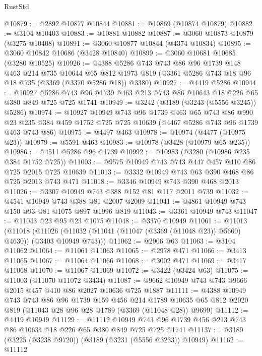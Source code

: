 \begin{lexlean}{RustStd}
\begin{coremodule}
@10879 := @2892 @10877 @10844
@10881 := @10869 (@10874 @10879)
@10882 := @3104 @10403
@10883 := @10881 @10882
@10887 := @3060 @10873 @10879 (@3275 @10408)
@10891 := @3060 @10877 @10844 (@4374 @10834)
@10895 := @3060 @10842 @10686 (@3428 @10840)
@10899 := @3060 @10681 @10685 (@3280 @10525)
@10926 := @4388
    @5286
    @743
    @743
    @86
    @96
    @1739
    @148
    @463
    @214
    @735
    @10644
    @65
    @812
    @1973
    @819
    (@3361 @5286 @743 @18 @96 @18 @735 (@3369 (@3370 @5286 @18)) @3380)
@10927 := @4419 @5286
@10944 := @10927
    @5286
    @743
    @96
    @1739
    @463
    @213
    @743
    @86
    @10643
    @18
    @226
    @65
    @380
    @849
    @725
    @725
    @1741
@10949 := @3242 (@3189 (@3243 (@5556 @3245)) @5286)
@10974 := @10927
    @10949
    @743
    @96
    @1739
    @463
    @65
    @743
    @86
    @990
    @23
    @235
    @384
    @459
    @1752
    @725
    @725
    @10639
    (@4467 @5286 @743 @96 @1739 @463 @743 @86)
@10975 := @4497 @463
@10978 := @10974 (@4477 (@10975 @23))
@10979 := @5591 @463
@10983 := @10978 (@3428 (@10979 @65 @235))
@10986 := @4511 @5286 @96 @1739
@10992 := @10983 (@3280 (@10986 @235 @384 @1752 @725))
@11003 := @9575 @10949 @743 @743 @447 @457 @410 @86 @725 @2015 @725 @10639
@11013 := @3332 @10949 @743 @63 @390 @468 @86 @725 @2013 @743 @471
@11018 := @3346 @10949 @743 @390 @468 @2013
@11026 := @3307 @10949 @743 @388 @152 @81 @117 @2011 @739
@11032 := @4541 @10949 @743 @388 @81 @2007 @2009
@11041 := @4861 @10949 @743 @150 @93 @81 @1075 @897 @1996 @819
@11043 := @3361 @10949 @743
@11047 := @11043 @23 @95 @23 @1075
@11048 := @3370 @10949
@11061 := @11013
    (@11018
      (@11026 (@11032 (@11041 (@11047 (@3369 (@11048 @23)) @5660) @4630)) (@3403 @10949 @743)))
@11062 := @2906 @63
@11063 := @3104 @11062
@11064 := @11061 @11063
@11065 := @2978 @471
@11066 := @3413 @11065
@11067 := @11064 @11066
@11068 := @3002 @471
@11069 := @3417 @11068
@11070 := @11067 @11069
@11072 := @3422 (@3424 @63)
@11075 := @11003 (@11070 @11072 @3434)
@11087 := @9662 @10949 @743 @743 @9666 @2015 @457 @410 @86 @2027 @10636 @725 @1887
@11111 := @4388
    @10949
    @743
    @743
    @86
    @96
    @1739
    @159
    @456
    @214
    @1789
    @10635
    @65
    @812
    @2020
    @819
    (@11043 @28 @96 @28 @1789 (@3369 (@11048 @28)) @9699)
@11112 := @4419 @10949
@11129 := @11112
    @10949
    @743
    @96
    @1739
    @456
    @213
    @743
    @86
    @10634
    @18
    @226
    @65
    @380
    @849
    @725
    @725
    @1741
@11137 := @3189 (@3225 (@3238 @9720)) (@3189 (@3231 (@5556 @3233)) @10949)
@11162 := @11112

\end{coremodule}
\end{lexlean}
